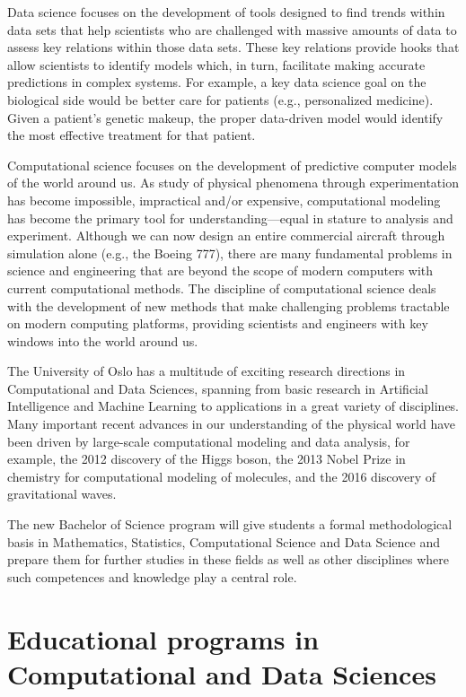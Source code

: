 \documentclass[oneside,final,10pt]{article}
\begin{document}
Data science focuses on the development of tools designed to find trends within data sets that help scientists who are challenged with massive amounts of data to assess key relations within those data sets. These key relations provide hooks that allow scientists to identify models which, in turn, facilitate making accurate predictions in complex systems. For example, a key data science goal on the biological side would be better care for patients (e.g., personalized medicine). Given a patient’s genetic makeup, the proper data-driven model would identify the most effective treatment for that patient. 

Computational science focuses on the development of predictive computer models of the world around us. As study of physical phenomena through experimentation has become impossible, impractical and/or expensive, computational modeling has become the primary tool for understanding—equal in stature to analysis and experiment. Although we can now design an entire commercial aircraft through simulation alone (e.g., the Boeing 777), there are many fundamental problems in science and engineering that are beyond the scope of modern computers with current computational methods. The discipline of computational science deals with the development of new methods that make challenging problems tractable on modern computing platforms, providing scientists and engineers with key windows into the world around us.

The University of Oslo has a multitude of exciting research directions in Computational and Data Sciences, spanning from basic research in Artificial Intelligence and Machine Learning to applications in a great variety of disciplines. Many important recent advances in our understanding of the physical world have been driven by large-scale computational modeling and data analysis, for example, the 2012 discovery of the Higgs boson, the 2013 Nobel Prize in chemistry for computational modeling of molecules, and the 2016 discovery of gravitational waves.

The new Bachelor of Science program will give students a formal methodological basis in Mathematics, Statistics, Computational Science and Data Science and prepare them for further studies in these fields as well as other disciplines where such competences and knowledge play a central role. 



\section*{Educational programs in Computational and Data Sciences}
\end{document}
